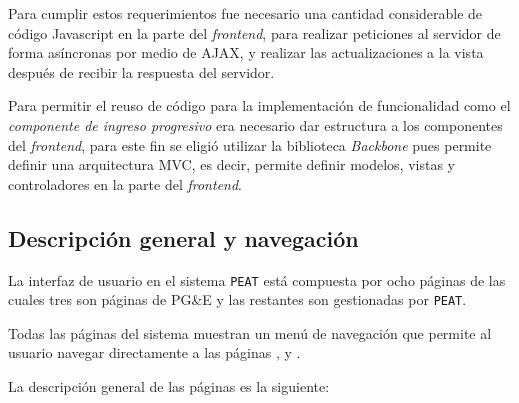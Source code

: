 Para cumplir estos requerimientos fue necesario una cantidad considerable
de código Javascript en la parte del \textit{frontend}, para realizar peticiones
al servidor de forma asíncronas por medio de AJAX, y realizar las actualizaciones
a la vista después de recibir la respuesta del servidor.

Para permitir el reuso de código para la implementación de funcionalidad como
el \textit{componente de ingreso progresivo} era necesario dar estructura a los
componentes del \textit{frontend}, para este fin se eligió utilizar la biblioteca
\textit{Backbone} pues permite definir una arquitectura MVC, es decir, permite
definir modelos, vistas y controladores en la parte del \textit{frontend}.

\subsection{Descripción general y navegación}

La interfaz de usuario en el sistema \texttt{PEAT} está compuesta por ocho páginas
de las cuales tres son páginas de PG\&E y las restantes son gestionadas por
\texttt{PEAT}.

Todas las páginas del sistema muestran un menú de navegación que permite al
usuario navegar directamente a las páginas ,
 y .

La descripción general de las páginas es la siguiente:

